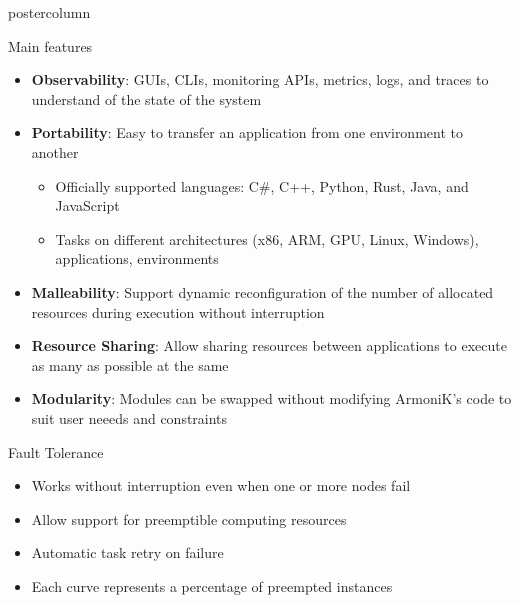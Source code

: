 \begin{frame}[fragile]
\begin{columns}[T]
\begin{column}{.49\textwidth}
\begin{beamercolorbox}[center,wd=\textwidth]{postercolumn}
\begin{minipage}[T]{.96\textwidth}
            \begin{block}{Main features}
                \begin{itemize}
                \item \textbf{Observability}: GUIs, CLIs, monitoring APIs, metrics, logs, and traces to understand of the state of the system
                \item \textbf{Portability}: Easy to transfer an application from one environment to another
                \begin{itemize}
                    \item Officially supported languages: C\#, C++, Python, Rust, Java, and JavaScript
                    \item Tasks on different architectures (x86, ARM, GPU, Linux, Windows), applications, environments
                \end{itemize}
                \item \textbf{Malleability}: Support dynamic reconfiguration of the number of allocated resources during execution without interruption
                \item \textbf{Resource Sharing}: Allow sharing resources between applications to execute as many as possible at the same
                \item \textbf{Modularity}: Modules can be swapped without modifying ArmoniK's code to suit user neeeds and constraints
                \end{itemize}
            \end{block}

            \begin{block}{Fault Tolerance}
              \begin{itemize}
              \item Works without interruption even when one or more nodes fail
              \item Allow support for preemptible computing resources
              \item Automatic task retry on failure
              \item Each curve represents a percentage of preempted instances
              \end{itemize}
              \begin{figure}
                \centering
                
              \end{figure}
            \end{block}


\end{minipage}
\end{beamercolorbox}
\end{column}
\end{columns}
\end{frame}

